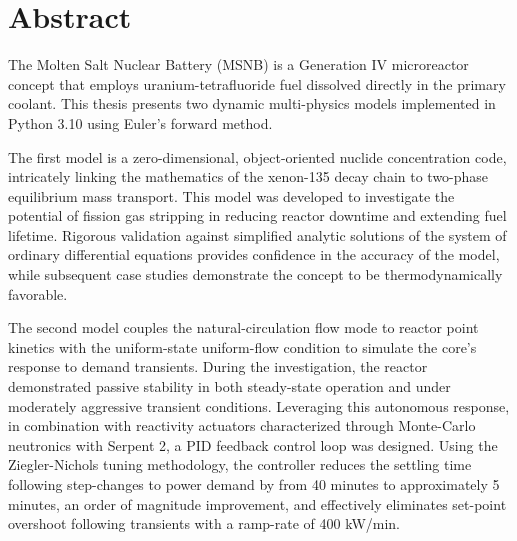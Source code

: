 \chapter{Abstract}
The Molten Salt Nuclear Battery (MSNB) is a Generation IV microreactor concept that employs uranium-tetrafluoride fuel dissolved directly in the primary coolant. This thesis presents two dynamic multi-physics models implemented in Python 3.10 using Euler's forward method. 

The first model is a zero-dimensional, object-oriented nuclide concentration code, intricately linking the mathematics of the xenon-135 decay chain to two-phase equilibrium mass transport. This model was developed to investigate the potential of fission gas stripping in reducing reactor downtime and extending fuel lifetime. Rigorous validation against simplified analytic solutions of the system of ordinary differential equations provides confidence in the accuracy of the model, while subsequent case studies demonstrate the concept to be thermodynamically favorable.

The second model couples the natural-circulation flow mode to reactor point kinetics with the uniform-state uniform-flow condition to simulate the core's response to demand transients. During the investigation, the reactor demonstrated passive stability in both steady-state operation and under moderately aggressive transient conditions. Leveraging this autonomous response, in combination with reactivity actuators characterized through Monte-Carlo neutronics with Serpent 2, a PID feedback control loop was designed. Using the Ziegler-Nichols tuning methodology, the controller reduces the settling time following step-changes to power demand by from 40 minutes to approximately 5 minutes, an order of magnitude improvement, and effectively eliminates set-point overshoot following transients with a ramp-rate of 400 kW/min.

